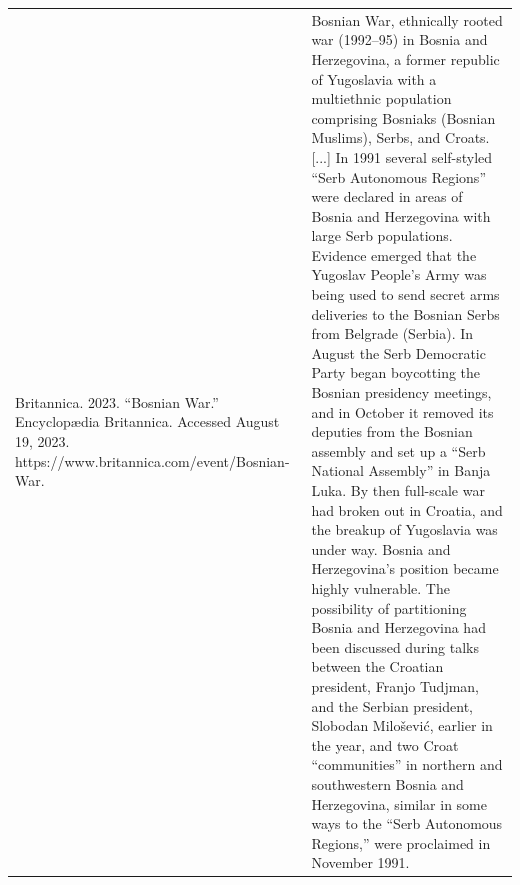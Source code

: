 {\begin{longtable}{p{}p{}}
Britannica. 2023. “Bosnian War.” Encyclopædia Britannica. Accessed August 19, 2023. https://www.britannica.com/event/Bosnian-War. & Bosnian War, ethnically rooted war (1992–95) in Bosnia and Herzegovina, a former republic of Yugoslavia with a multiethnic population comprising Bosniaks (Bosnian Muslims), Serbs, and Croats. [...] In 1991 several self-styled “Serb Autonomous Regions” were declared in areas of Bosnia and Herzegovina with large Serb populations. Evidence emerged that the Yugoslav People's Army was being used to send secret arms deliveries to the Bosnian Serbs from Belgrade (Serbia). In August the Serb Democratic Party began boycotting the Bosnian presidency meetings, and in October it removed its deputies from the Bosnian assembly and set up a “Serb National Assembly” in Banja Luka. By then full-scale war had broken out in Croatia, and the breakup of Yugoslavia was under way. Bosnia and Herzegovina's position became highly vulnerable. The possibility of partitioning Bosnia and Herzegovina had been discussed during talks between the Croatian president, Franjo Tudjman, and the Serbian president, Slobodan Milošević, earlier in the year, and two Croat “communities” in northern and southwestern Bosnia and Herzegovina, similar in some ways to the “Serb Autonomous Regions,” were proclaimed in November 1991.
\\

\end{longtable}}
